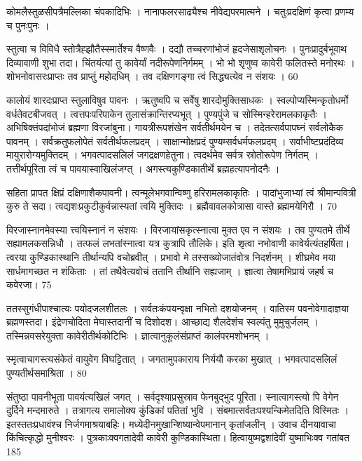 कोमलैस्तुळसीपत्रैमल्लिका चंपकादिभिः ।
नानाफलरसाढ्यैश्च नीवेद्यपरमात्मने ।
चतुःप्रदक्षिणं कृत्वा प्रणम्य च पुनःपुनः ।

स्तुत्वा च विविधै स्तोत्रैह्झौतैस्स्मार्तेश्च वैष्णवैः ।
दद्यौ तच्चरणांभोजं हृदजेसाशृलोचनः ।
पुनःप्रादुर्बभूवाथ दिव्यावाणी शुभा तदा।
चिंतयंत्यां तु कावेर्यां नदीरूपेणनिर्गमम् ।
भो भो शृणुष्व कावेरी फलितस्ते मनोरथः ।
शोभनोवासरःप्राप्तः तव प्राप्तुं महोदधिम् ।
तव दक्षिणगङ्गा त्वं सिद्ध्यत्येव न संशयः ।
60

कालोयं शारदःप्राप्त स्तुलाविषुव पावनः ।
ऋतुष्वपि च सर्वेषु शारदोमुक्तिसाधकः ।
स्वल्पोप्यस्मिन्कृतोधर्मो वर्धतेवटबीजवत् ।
त्वत्तपःपरिपाकेन तुलासंक्रान्तिरप्यभूत् ।
पुण्यपुंजे च सोस्मिन्हरेरामलकाकृतैः ।
अभिषिक्तंपदांभोजं ब्रह्मणा विरजांबुना।
गायत्रीरूपशंखेन सर्वतीर्थमयेन च ।
तदेतत्सर्वपापघ्नं सर्वलोकैक पावनम् ।
सर्वक्रतुफलोपेतं सर्वतीर्थफलप्रदम् ।
साक्षान्मोक्षप्रदं पुण्यम्सर्वधर्मफलप्रदम् ।
सर्वाभीष्टप्रदंदिव्य मायुरारोग्यमुक्तिदम् ।
भगवत्पादसलिलं जगद्रक्षणहेतुना।
त्वदर्थमेव सर्वत्र स्रोतोरूपेण निर्गतम् ।
तत्तीर्थपूरिता त्वं च पावयास्वाखिलंजग्त् ।
अगस्त्यकुण्डिकातीर्थे ब्रह्महत्यापनोदनैः ।

सहिता प्रापत क्षिप्रं दक्षिणाशैकपावनी।
त्वन्मूलेभगवान्विष्णु हरिरामलकाकृतिः ।
पादांभुजाभ्यां त्वं श्रीमान्पवित्री कुरु ते सदा।
त्वद्यशःप्रकुटीकुर्वन्नास्यतां त्वयि मुक्तिदः ।
ब्रह्मैवावलकोत्रासा वास्ते ब्रह्ममयेगिरौ ।
70

विरजास्नानमेवस्या त्त्वयिस्नानं न संशयः ।
विरजायांसकृत्स्नात्वा मुक्त एव न संशयः ।
तव पुण्यतमे तीर्थे सह्यामलकसन्निधौ ।
तत्फलं लभतांस्नात्वा यत्र कुत्रापि तौलिके।
इति शृत्वा नभोवाणी कावेर्यत्यंतहर्षिता।
त्वरया कुण्डिकास्थानि तीर्थान्यपि वचोब्रवीत् ।
प्रभावो मे तस्सख्योजातंवोत्र निदर्शनम् ।
शीघ्रमेव मया सार्धमागच्छत न शंकिताः ।
तां तथैवेत्यवोचं ततानि तीर्थानि सह्यजाम् ।
ज्ञात्वा तेषामभिप्रायं जहर्ष च कवेरजा।
75

ततस्सुगंधीपाश्चात्यः पयोदजलशीतलः ।
सर्वतःकंपयन्वृक्षा नभितो दशयोजनम् ।
वातिस्म पवनोवेगादाज्ञया ब्रह्मणस्तदा।
इंद्रेणचोदिता मेघास्तदानीं च दिशोदश।
आच्छाद्य शैलदेशंच स्वल्पंतु मुमुचुर्जलम् ।
तस्मिन्नवसरेयुक्ता कावेरीतीर्थकोटिभिः ।
ज्ञात्वानुकूलंसंप्राप्तं कालंपरमशोभनम् ।

स्मृत्वाचागस्त्यसंकेतं वायुवेग विघट्टितात् ।
जगतामुपकाराय निर्ययौ करका मुखात् ।
भगवत्पादसलिलं पुण्यतीर्थसमाश्रिता ।
80

संतुष्ठा पावनीभूता पावयंत्यखिलं जगत् ।
सर्वदृश्याप्रसुस्राव फेनबुद्भुद पूरिता।
स्नात्वागस्त्यो पि वेगेन दुर्दिने मन्दमारुते ।
तत्रागत्य समालोक्य कुंडिकां पतितां भुवि ।
संबमात्सर्वतःपश्यन्किमेतदिति विस्मितः ।
इतस्ततःप्रधावंश्च निर्जगमाश्रयाबहिः।
मध्येदीनमुखान्शिष्यान्वेपमानान् कृतांजलीन् ।
उवाच दीनयावाचा किंचित्कृद्धो मुनीश्वरः ।
पुत्रकाःक्वगतादेवी कावेरी कुण्डिकास्थिता।
हित्वायुष्मद्वशांदेवीं युष्माभिःक्व गतांबत 185

